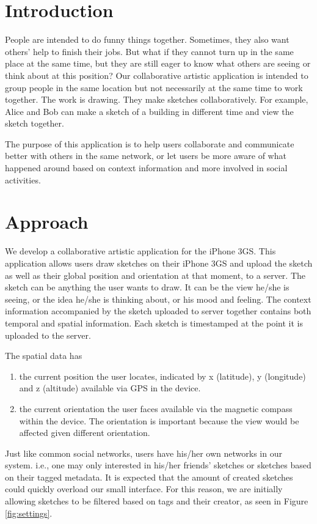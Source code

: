\documentclass{chi2009}
\begin{document}
\section{Introduction}
People are intended to do funny things together. Sometimes, they also want others' help to finish their jobs. But what if they cannot turn up in the same place at the same time, but they are still eager to know what others are seeing or think about at this position? Our collaborative artistic application is intended to group people in the same location but not necessarily at the same time to work together. The work is drawing. They make sketches collaboratively. For example, Alice and Bob can make a sketch of a building in different time and view the sketch together.

The purpose of this application is to help users collaborate and communicate better with others in the same network, or let users be more aware of what happened around based on context information and more involved in social activities.

\section{Approach}
We develop a collaborative artistic application for the iPhone 3GS. This application allows users draw sketches on their iPhone 3GS and upload the sketch as well as their global position and orientation at that moment, to a server. The sketch can be anything the user wants to draw. It can be the view he/she is seeing, or the idea he/she is thinking about, or his mood and feeling. The context information accompanied by the sketch uploaded to server together contains both temporal and spatial information. Each sketch is timestamped at the point it is uploaded to the server.

The spatial data has
\begin{enumerate}
\item the current position the user locates, indicated by x (latitude), y
	(longitude) and z (altitude) available via GPS in the device.
\item the current orientation the user faces available via the magnetic compass
	within the device.  The orientation is important because the view would be
	affected given different orientation.
\end{enumerate}

Just like common social networks, users have his/her own networks in our
system. i.e., one may only interested in his/her friends' sketches or sketches
based on their tagged metadata.  It is expected that the amount of created
sketches could quickly overload our small interface.  For this reason, we are
initially allowing sketches to be filtered based on tags and their creator, as
seen in Figure \ref{fig:settings}.
\end{document}
